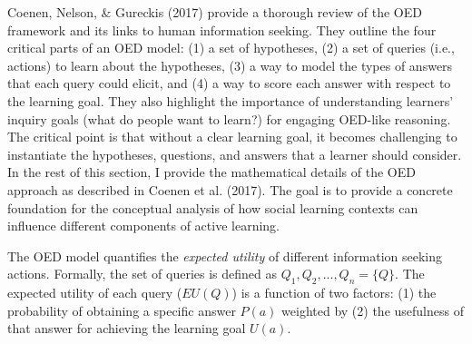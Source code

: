 \documentclass[oneside]{report}
\begin{document}

Coenen, Nelson, \& Gureckis (2017) provide a thorough review of the OED
framework and its links to human information seeking. They outline the
four critical parts of an OED model: (1) a set of hypotheses, (2) a set
of queries (i.e., actions) to learn about the hypotheses, (3) a way to
model the types of answers that each query could elicit, and (4) a way
to score each answer with respect to the learning goal. They also
highlight the importance of understanding learners' inquiry goals (what
do people want to learn?) for engaging OED-like reasoning. The critical
point is that without a clear learning goal, it becomes challenging to
instantiate the hypotheses, questions, and answers that a learner should
consider. In the rest of this section, I provide the mathematical
details of the OED approach as described in Coenen et al. (2017). The
goal is to provide a concrete foundation for the conceptual analysis of
how social learning contexts can influence different components of
active learning.

The OED model quantifies the \emph{expected utility} of different
information seeking actions. Formally, the set of queries is defined as
\(Q_1, Q_2,..., Q_n = \{Q\}\). The expected utility of each query
(\(EU(Q)\)) is a function of two factors: (1) the probability of
obtaining a specific answer \(P(a)\) weighted by (2) the usefulness of
that answer for achieving the learning goal \(U(a)\).
\end{document}
